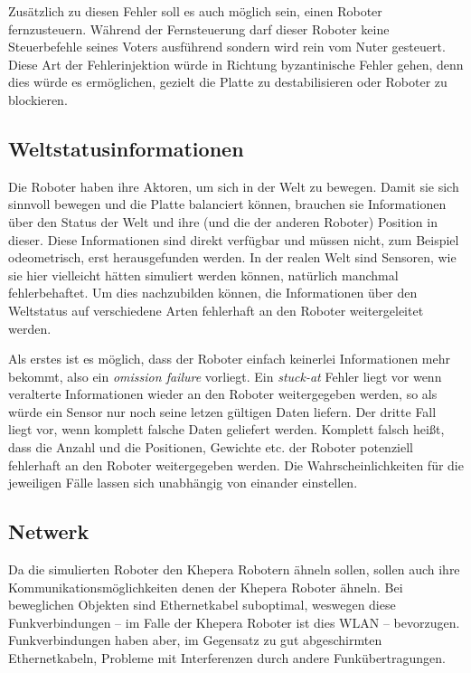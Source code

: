 Zus{\"{a}}tzlich zu diesen Fehler soll es auch m{\"{o}}glich sein, einen Roboter fernzusteuern. W{\"{a}}hrend
der Fernsteuerung darf dieser Roboter keine Steuerbefehle seines Voters ausf{\"{u}}hrend sondern wird rein
vom Nuter gesteuert. Diese Art der Fehlerinjektion w{\"{u}}rde in Richtung byzantinische Fehler gehen,
denn dies w{\"{u}}rde es erm{\"{o}}glichen, gezielt die Platte zu destabilisieren oder Roboter zu
blockieren.

\subsection{Weltstatusinformationen}
Die Roboter haben ihre Aktoren, um sich in der Welt zu bewegen. Damit sie sich sinnvoll bewegen und die
Platte balanciert k{\"{o}}nnen, brauchen sie Informationen {\"{u}}ber den Status der Welt und ihre
(und die der anderen Roboter) Position in dieser. Diese Informationen sind direkt verf{\"{u}}gbar
und m{\"{u}}ssen nicht, zum Beispiel odeometrisch, erst herausgefunden werden. In der realen Welt sind
Sensoren, wie sie hier vielleicht h{\"{a}}tten simuliert werden k{\"{o}}nnen, nat{\"{u}}rlich manchmal 
fehlerbehaftet. Um dies nachzubilden k{\"{o}}nnen, die Informationen {\"{u}}ber den Weltstatus auf
verschiedene Arten fehlerhaft an den Roboter weitergeleitet werden.

Als erstes ist es m{\"{o}}glich, dass der Roboter einfach keinerlei Informationen mehr bekommt, also ein \textit{omission failure} vorliegt. Ein \textit{stuck-at} Fehler liegt
vor wenn veralterte Informationen wieder an den Roboter weitergegeben werden, so als w{\"{u}}rde ein Sensor nur noch seine letzen g{\"{u}}ltigen Daten liefern. Der dritte
Fall liegt vor, wenn komplett falsche Daten geliefert werden. Komplett falsch hei{\ss}t, dass die Anzahl und die Positionen, Gewichte etc. der Roboter potenziell fehlerhaft an
den Roboter weitergegeben werden. Die Wahrscheinlichkeiten f{\"{u}}r die jeweiligen F{\"{a}}lle lassen sich unabh{\"{a}}ngig von einander einstellen.

\subsection{Netwerk}
Da die simulierten Roboter den Khepera Robotern {\"{a}}hneln sollen, sollen auch ihre 
Kommunikationsm{\"{o}}glichkeiten denen der Khepera Roboter {\"{a}}hneln. Bei beweglichen
Objekten sind Ethernetkabel suboptimal, weswegen diese Funkverbindungen -- im Falle der Khepera
Roboter ist dies WLAN -- bevorzugen. Funkverbindungen haben aber, im Gegensatz zu gut abgeschirmten
Ethernetkabeln, Probleme mit Interferenzen durch andere Funk{\"{u}}bertragungen.


